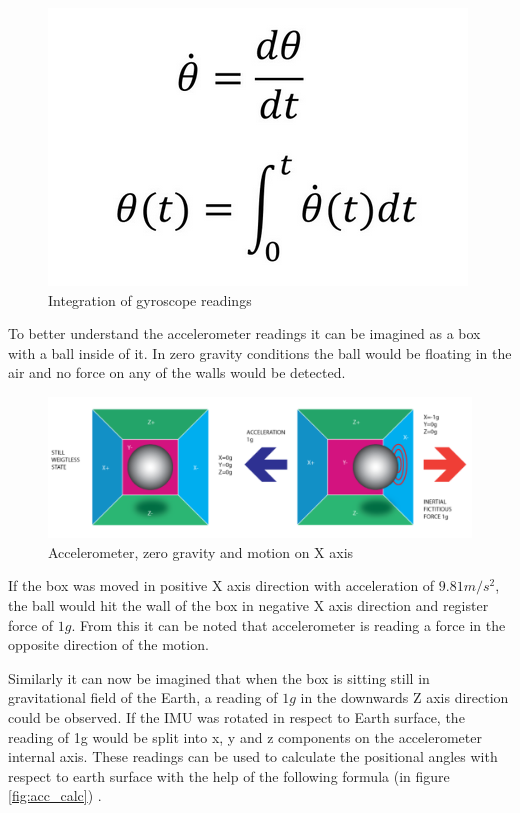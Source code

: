 \begin{figure}[H]
    \begin{center}
    \includegraphics[scale = 0.4]{pictures/IMU/gyro_calculation.png}
    \end{center}
    \caption{Integration of gyroscope readings}
    \label{fig:Gyro_calcfig}
\end{figure}


To better understand the accelerometer readings it can be imagined as a box with a ball inside of it. In zero gravity conditions the ball would be floating in the air and no force on any of the walls would be detected.


\begin{figure}[H]
    \begin{center}
    \includegraphics[scale = 0.5]{pictures/IMU/Accel_0grav.png}
    \end{center}
    \caption{Accelerometer, zero gravity and motion on X axis }
    \label{fig:my_label}
\end{figure}

If the box was moved in positive X axis direction with acceleration of $9.81 m/s^2$, the ball would hit the wall of the box in negative X axis direction and register force of $1g$. From this it can be noted that accelerometer is reading a force in the opposite direction of the motion. 

Similarly it can now be imagined that when the box is sitting still in gravitational field of the Earth, a reading of $1g$ in the downwards Z axis direction could be observed. If the IMU was rotated in respect to Earth surface, the reading of 1g would be split into x, y and z components on the accelerometer internal axis. These readings can be used to calculate the positional angles with respect to earth surface with the help of the following formula (in figure \ref{fig:acc_calc}) \cite{Rotation}.


